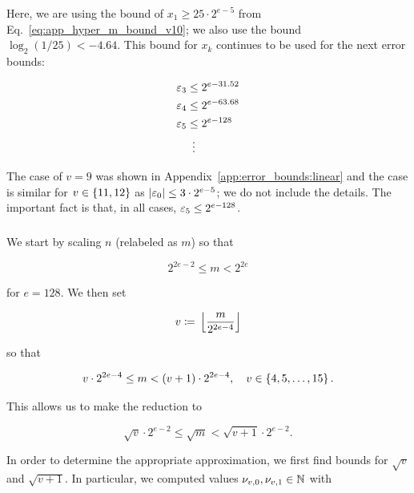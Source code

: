 \begin{itemize}
\noindent
Here, we are using the bound of $x_{1}\ge25\cdot2^{e-5}$
from Eq.~\eqref{eq:app_hyper_m_bound_v10};
we also use the bound $\log_{2}(1/25) < -4.64$.
This bound for $x_{k}$ continues to be used for the next error bounds:

\begin{align}
    \varepsilon_{3} &\le 2^{e-31.52} \nonumber\\
    \varepsilon_{4} &\le 2^{e-63.68} \nonumber\\
    \varepsilon_{5} &\le 2^{e-128} \nonumber\\
        &\ \vdots
\end{align}

The case of $v = 9$ was shown in Appendix~\ref{app:error_bounds:linear}
and the case is similar for $v\in\left\{ 11,12 \right\}$
as $\left| \varepsilon_{0} \right| \le 3\cdot2^{e-5}$;
we do not include the details.
The important fact is that, in all cases, $\varepsilon_{5}\le 2^{e-128}$.
\end{itemize}


\subsubsection{\LookupFour{}}
\label{app:error_bounds:lookup4}

We start by scaling $n$ (relabeled as $m$) so that

\begin{equation}
    2^{2e-2} \le m < 2^{2e}
\end{equation}

\noindent
for $e = 128$.
We then set

\begin{equation}
    v \coloneqq{} \left\lfloor \frac{m}{2^{2e-4}} \right\rfloor
\end{equation}

\noindent
so that

\begin{equation}
    v\cdot2^{2e-4} \le m < \left( v+1 \right)\cdot2^{2e-4},
    \quad v\in\left\{ 4, 5, \dots, 15 \right\}.
\end{equation}

\noindent
This allows us to make the reduction to

\begin{equation}
    \sqrt{v}\cdot2^{e-2} \le \sqrt{m} < \sqrt{v+1}\cdot2^{e-2}.
    \label{eq:app_lookup4_m_bound}
\end{equation}

In order to determine the appropriate approximation,
we first find bounds for $\sqrt{v}$ and $\sqrt{v+1}$.
In particular, we computed values $\nu_{v,0}, \nu_{v,1}\in\mathbb{N}$ with

